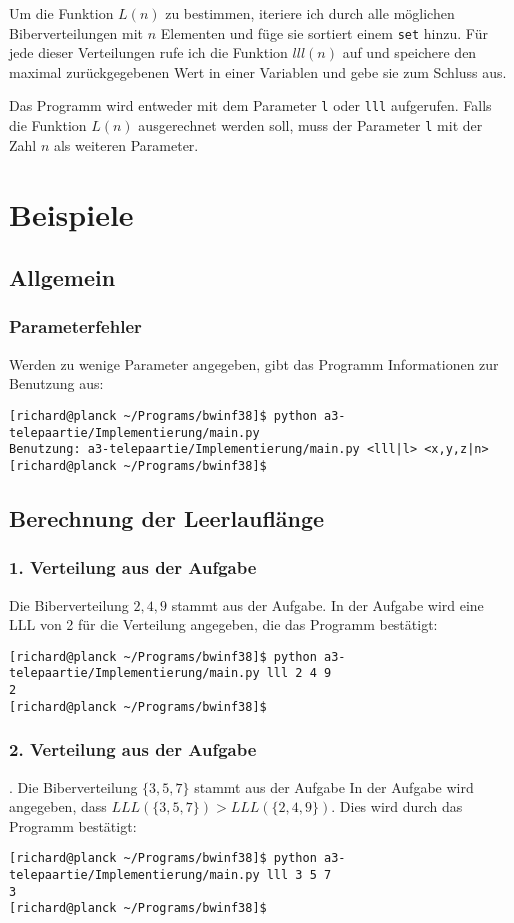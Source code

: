 \documentclass[a4paper,10pt,ngerman]{scrartcl}
\begin{document}
Um die Funktion $L(n)$ zu bestimmen, iteriere ich durch alle möglichen Biberverteilungen mit $n$ Elementen und füge sie sortiert einem \texttt{set} hinzu.
Für jede dieser Verteilungen rufe ich die Funktion $lll(n)$ auf und speichere den maximal zurückgegebenen Wert in einer Variablen und gebe sie zum Schluss aus.

Das Programm wird entweder mit dem Parameter \texttt{l} oder \texttt{lll} aufgerufen.
Falls die Funktion $L(n)$ ausgerechnet werden soll, muss der Parameter \texttt{l} mit der Zahl $n$ als weiteren Parameter.

\section{Beispiele}
\subsection{Allgemein}
\subsubsection{Parameterfehler}
Werden zu wenige Parameter angegeben, gibt das Programm Informationen zur Benutzung aus:
\begin{lstlisting}
[richard@planck ~/Programs/bwinf38]$ python a3-telepaartie/Implementierung/main.py
Benutzung: a3-telepaartie/Implementierung/main.py <lll|l> <x,y,z|n>
[richard@planck ~/Programs/bwinf38]$ 
\end{lstlisting}

\subsection{Berechnung der Leerlauflänge}
\subsubsection{1. Verteilung aus der Aufgabe}
Die Biberverteilung ${2,4,9}$ stammt aus der Aufgabe.
In der Aufgabe wird eine LLL von 2 für die Verteilung angegeben, die das Programm bestätigt:
\begin{lstlisting}
[richard@planck ~/Programs/bwinf38]$ python a3-telepaartie/Implementierung/main.py lll 2 4 9
2
[richard@planck ~/Programs/bwinf38]$ 
\end{lstlisting}

\subsubsection{2. Verteilung aus der Aufgabe}.
Die Biberverteilung $\{3,5,7\}$ stammt aus der Aufgabe
In der Aufgabe wird angegeben, dass $LLL(\{3,5,7\}) > LLL(\{2,4,9\})$.
Dies wird durch das Programm bestätigt:
\begin{lstlisting}
[richard@planck ~/Programs/bwinf38]$ python a3-telepaartie/Implementierung/main.py lll 3 5 7
3
[richard@planck ~/Programs/bwinf38]$ 
\end{lstlisting}
\end{document}
